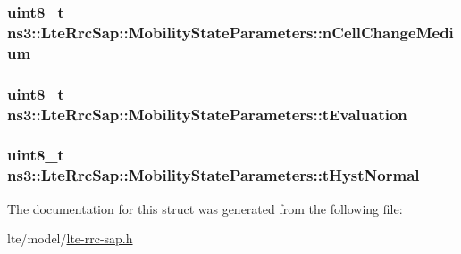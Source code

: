 \subsubsection[{\texorpdfstring{n\+Cell\+Change\+Medium}{nCellChangeMedium}}]{\setlength{\rightskip}{0pt plus 5cm}uint8\+\_\+t ns3\+::\+Lte\+Rrc\+Sap\+::\+Mobility\+State\+Parameters\+::n\+Cell\+Change\+Medium}\hypertarget{structns3_1_1LteRrcSap_1_1MobilityStateParameters_a967cbee6afce4687f2f45fe3108b9f48}{}\label{structns3_1_1LteRrcSap_1_1MobilityStateParameters_a967cbee6afce4687f2f45fe3108b9f48}
\subsubsection[{\texorpdfstring{t\+Evaluation}{tEvaluation}}]{\setlength{\rightskip}{0pt plus 5cm}uint8\+\_\+t ns3\+::\+Lte\+Rrc\+Sap\+::\+Mobility\+State\+Parameters\+::t\+Evaluation}\hypertarget{structns3_1_1LteRrcSap_1_1MobilityStateParameters_a7e9a414d1e84cee306117afbf92ee5e1}{}\label{structns3_1_1LteRrcSap_1_1MobilityStateParameters_a7e9a414d1e84cee306117afbf92ee5e1}
\subsubsection[{\texorpdfstring{t\+Hyst\+Normal}{tHystNormal}}]{\setlength{\rightskip}{0pt plus 5cm}uint8\+\_\+t ns3\+::\+Lte\+Rrc\+Sap\+::\+Mobility\+State\+Parameters\+::t\+Hyst\+Normal}\hypertarget{structns3_1_1LteRrcSap_1_1MobilityStateParameters_ad766d02b317550e93758310bbc6016c7}{}\label{structns3_1_1LteRrcSap_1_1MobilityStateParameters_ad766d02b317550e93758310bbc6016c7}


The documentation for this struct was generated from the following file\+:\begin{DoxyCompactItemize}
\item 
lte/model/\hyperlink{lte-rrc-sap_8h}{lte-\/rrc-\/sap.\+h}\end{DoxyCompactItemize}

